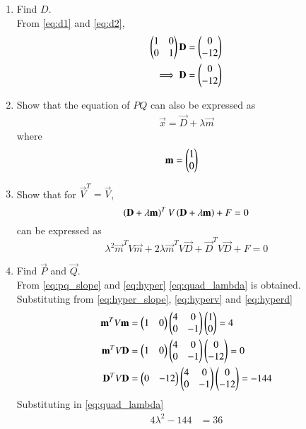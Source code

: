 \begin{enumerate}[label=\arabic*.,ref=\thesubsection.\theenumi]
%
\item Find $D$.
\\
\solution
From \eqref{eq:d1} and \eqref{eq:d2},
\begin{align}
 \begin{pmatrix}1 & 0 \\ 0 &  1\end{pmatrix}\mathbf{D} &= \begin{pmatrix}0 \\ -12 \end{pmatrix}
\\
\implies  \mathbf{D} &= \begin{pmatrix}0 \\ -12 \end{pmatrix}
\label{eq:hyperd}
\end{align}
%
\item Show that the equation of $PQ$ can also be expressed as
\begin{align}
\label{eq:pq_slope}
\vec{x} = \vec{D}+\lambda \vec{m}
\end{align}
where
\begin{align}
\mathbf{m} &=   \begin{pmatrix}1 \\ 0\end{pmatrix}
\label{eq:hyper_slope}
\end{align}
%
\item Show that for $\vec{V}^T = \vec{V}$,
\begin{equation}
\label{eq:quad_md}
\left(\mathbf{D}+\lambda\mathbf{m}\right)^TV\left(\mathbf{D}+\lambda\mathbf{m}\right) + F= 0 
\end{equation}
can be expressed as
\begin{equation}
\label{eq:quad_lambda}
\lambda^2\vec{m}^TV\vec{m}+2\lambda\vec{m}^TV\vec{D}+\vec{D}^TV\vec{D}
+ F = 0
\end{equation}
%
\item Find $\vec{P}$ and $\vec{Q}$.
\\
\solution From \eqref{eq:pq_slope} and \eqref{eq:hyper} \eqref{eq:quad_lambda} is obtained.
%
Substituting from \eqref{eq:hyper_slope}, \eqref{eq:hyperv} and \eqref{eq:hyperd}
\begin{align}
\mathbf{m}^TV\mathbf{m} &= \begin{pmatrix}1& 0\end{pmatrix} \begin{pmatrix}4 & 0 \\ 0 & -1\end{pmatrix}\begin{pmatrix}1 \\ 0\end{pmatrix} = 4
\\
\mathbf{m}^TV\mathbf{D} & = \begin{pmatrix}1& 0\end{pmatrix}\begin{pmatrix}4 & 0 \\ 0 & -1\end{pmatrix}\begin{pmatrix}0 \\ -12 \end{pmatrix} = 0
\\
\mathbf{D}^TV\mathbf{D} &= \begin{pmatrix}0 & -12 \end{pmatrix}\begin{pmatrix}4 & 0 \\ 0 & -1\end{pmatrix}\begin{pmatrix}0 \\ -12 \end{pmatrix} = -144
\end{align}
%
Substituting in \eqref{eq:quad_lambda}
\begin{align}
4 \lambda^2 - 144 &= 36

\end{align}
\end{enumerate}
